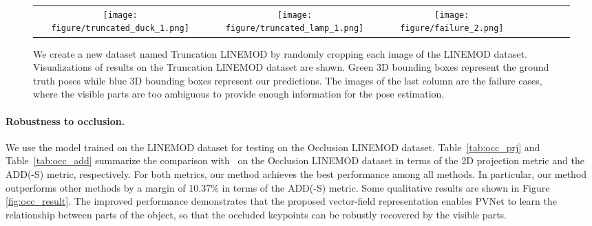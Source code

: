 \documentclass[10pt,twocolumn,letterpaper]{article}
\begin{document}
\begin{figure*}[t]
{\begin{tabular}{cccccccc}
			\texttt{[image: figure/truncated\_duck\_1.png]} &
			\texttt{[image: figure/truncated\_lamp\_1.png]} &
			\texttt{[image: figure/failure\_2.png]}
		\end{tabular}
	} \vspace{2mm}
	\caption{We create a new dataset named Truncation LINEMOD by randomly cropping each image of the LINEMOD dataset. Visualizations of results on the Truncation LINEMOD dataset are shown. Green 3D bounding boxes represent the ground truth poses while blue 3D bounding boxes represent our predictions. The images of the last column are the failure cases, where the visible parts are too ambiguous to provide enough information for the pose estimation.}
	\vspace{-4mm}
	\label{fig:trun_result}
\end{figure*}\paragraph{Robustness to occlusion.} We use the model trained on the LINEMOD dataset for testing on the Occlusion LINEMOD dataset. Table~\ref{tab:occ_prj} and Table~\ref{tab:occ_add} summarize the comparison with~\cite{tekin2018real, xiang2017posecnn, oberweger2018making} on the Occlusion LINEMOD dataset in terms of the 2D projection metric and the ADD(-S) metric, respectively. For both metrics, our method achieves the best performance among all methods. In particular, our method outperforms other methods by a margin of 10.37\% in terms of the ADD(-S) metric. Some qualitative results are shown in Figure \ref{fig:occ_result}. The improved performance demonstrates that the proposed vector-field representation enables PVNet to learn the relationship between parts of the object, so that the occluded keypoints can be robustly recovered by the visible parts.
\end{document}
